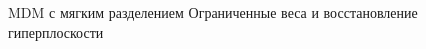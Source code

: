 \SPBGSectionSlide
  {MDM с мягким разделением}
  {Ограниченные веса и восстановление гиперплоскости}
